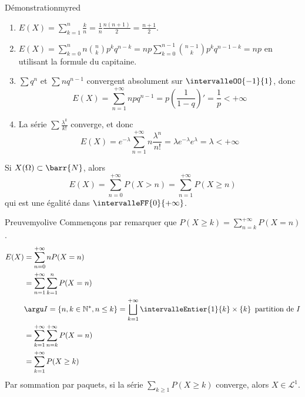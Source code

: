     \begin{omed}{Démonstration}{myred}
        \begin{enumerate}
            \item $E(X) = \sum_{k=1}^n \frac{k}{n} = \frac{1}{n} \frac{n(n+1)}{2} = \frac{n+1}{2}$.
            \item $E(X) = \sum_{k=0}^n n \binom{n}{k} p^k q^{n-k} = np \sum_{k=0}^{n-1} \binom{n-1}{k} p^k q^{n-1-k} = np$ en utilisant la formule du capitaine.
            \item $\sum q^n$ et $\sum n q^{n-1}$ convergent absolument sur $\intervalleOO{-1}{1}$, donc 
            \[ E(X) = \sum_{n=1}^{+\infty} n p q^{n-1} = p \left(\frac{1}{1-q}\right)' = \frac{1}{p} < +\infty \]   
            \item La série $\sum \frac{\lambda^k}{k!}$ converge, et donc 
            \[ E(X) = e^{-\lambda} \sum_{n=1}^{+\infty} n \frac{\lambda^n}{n!} = \lambda e^{-\lambda} e^{\lambda} = \lambda < +\infty \]   
        \end{enumerate}
    \end{omed}

    \begin{prop}{}{}
        Si $X(\Omega) \subset \barr{N}$, alors
        \[ E(X) = \sum_{n = 0}^{+\infty} P(X > n) = \sum_{n=1}^{+\infty} P(X \geq n) \]   
        qui est une égalité dans $\intervalleFF{0}{+\infty}$.
    \end{prop}

    \begin{demo}{Preuve}{myolive}
        Commençons par remarquer que $P(X \geq k) = \sum_{n=k}^{+\infty} P(X = n)$.
        \begin{align*}
            E(X) 
            &= \sum_{n = 0}^{+\infty} n P(X = n) \\
            &= \sum_{n = 1}^{+\infty} \sum_{k= 1}^n P(X = n) \\
            &\argu I = \left\{n,k \in \mathbb{N}^*, n \leq k\right\} = \bigsqcup_{k=1}^{+\infty} \intervalleEntier{1}{k} \times \left\{k\right\} \text{ partition de } I \\
            &= \sum_{k = 1}^{+\infty} \sum_{n=k}^{+\infty} P(X = n) \\
            &= \sum_{k= 1}^{+\infty} P(X \geq k) 
        \end{align*}
        Par sommation par paquets, si la série $\sum_{k \geq 1} P(X \geq k)$ converge, alors $X \in \mathcal{L}^1$.
    \end{demo}

